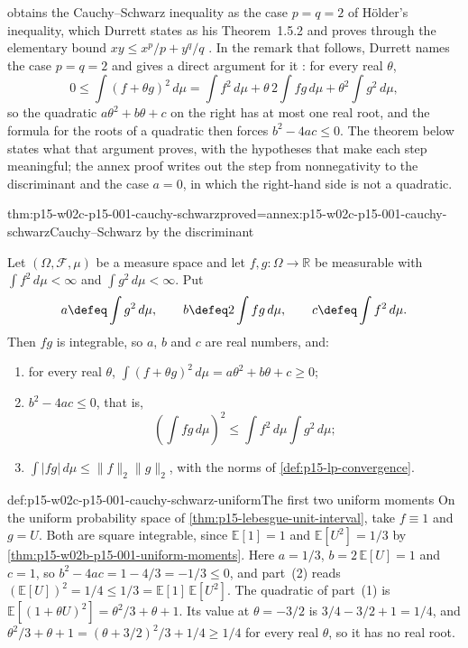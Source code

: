  obtains the Cauchy--Schwarz inequality as
the case \(p=q=2\) of H\"older's inequality, which Durrett states as his
Theorem~1.5.2 and proves through the elementary bound
\(xy\leq x^p/p+y^q/q\) \cite[thm.~1.5.2, p.~25]{DurrettPTEAuthor2019}.
In the remark that follows, Durrett names the case \(p=q=2\) and gives a
direct argument for it \cite[remark after thm.~1.5.2, p.~26]{DurrettPTEAuthor2019}:
for every real \(\theta\),
\[
 0\leq\int(f+\theta g)^2\,d\mu
 =\int f^2\,d\mu+\theta\,2\int fg\,d\mu+\theta^2\int g^2\,d\mu ,
\]
so the quadratic \(a\theta^2+b\theta+c\) on the right has at most one real
root, and the formula for the roots of a quadratic then forces
\(b^2-4ac\leq0\). The theorem below states what that argument proves, with
the hypotheses that make each step meaningful; the annex proof writes out
the step from nonnegativity to the discriminant and the case \(a=0\), in
which the right-hand side is not a quadratic.

\begin{hbtheorem}{thm:p15-w02c-p15-001-cauchy-schwarz}{proved=annex:p15-w02c-p15-001-cauchy-schwarz}{Cauchy--Schwarz by the discriminant}
\par\nobreak
Let \((\Omega,\mathcal F,\mu)\) be a measure space and let
\(f,g:\Omega\to\mathbb R\) be measurable with
\(\int f^2\,d\mu<\infty\) and \(\int g^2\,d\mu<\infty\). Put
\[
 a\defeq\int g^2\,d\mu,\qquad b\defeq2\int fg\,d\mu,\qquad
 c\defeq\int f^2\,d\mu .
\]
Then \(fg\) is integrable, so \(a\), \(b\) and \(c\) are real numbers, and:
\begin{enumerate}
\item for every real \(\theta\),
      \(\int(f+\theta g)^2\,d\mu=a\theta^2+b\theta+c\geq0\);
\item \(b^2-4ac\leq0\), that is,
      \[
       \left(\int fg\,d\mu\right)^2\leq\int f^2\,d\mu\int g^2\,d\mu ;
      \]
\item \(\int|fg|\,d\mu\leq\|f\|_2\|g\|_2\), with the norms of
      \cref{def:p15-lp-convergence}.
\end{enumerate}
\end{hbtheorem}

\begin{hbexample}{def:p15-w02c-p15-001-cauchy-schwarz-uniform}{The first two uniform moments}
On the uniform probability space of \cref{thm:p15-lebesgue-unit-interval},
take \(f\equiv1\) and \(g=U\). Both are square integrable, since
\(\mathbb E[1]=1\) and \(\mathbb E[U^2]=1/3\) by
\cref{thm:p15-w02b-p15-001-uniform-moments}. Here \(a=1/3\),
\(b=2\,\mathbb E[U]=1\) and \(c=1\), so \(b^2-4ac=1-4/3=-1/3\leq0\), and
part~(2) reads \((\mathbb E[U])^2=1/4\leq1/3=\mathbb E[1]\,\mathbb E[U^2]\).
The quadratic of part~(1) is
\(\mathbb E[(1+\theta U)^2]=\theta^2/3+\theta+1\). Its value at
\(\theta=-3/2\) is \(3/4-3/2+1=1/4\), and
\(\theta^2/3+\theta+1=(\theta+3/2)^2/3+1/4\geq1/4\) for every real
\(\theta\), so it has no real root.
\end{hbexample}

